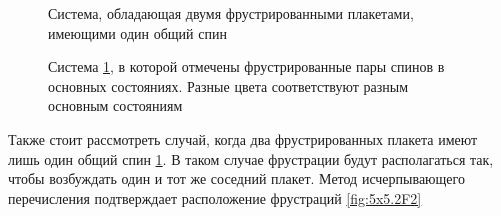 \documentclass[utf8, babel, sor, jor, amsmath, amssymb, reprint]{elsarticle} %
\begin{document}
\begin{figure}[h]
	\centering
	\caption{Система, обладающая двумя фрустрированными плакетами, имеющими один общий спин}
	\label{fig:5x5.2F}
\end{figure}
\begin{figure}[h]
	\centering
	\caption{Система \ref{fig:5x5.2F}, в которой отмечены фрустрированные пары спинов в основных состояниях. Разные цвета соответствуют разным основным состояниям}
	\label{fig:5x5.22F}
\end{figure}
Также стоит рассмотреть случай, когда два фрустрированных плакета имеют лишь один общий спин \ref{fig:5x5.2F}.
В таком случае фрустрации будут располагаться так, чтобы возбуждать один и тот же соседний плакет.
Метод исчерпывающего перечисления подтверждает расположение фрустраций \ref{fig:5x5.2F2}
\end{document}
